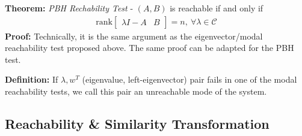 \documentclass[twoside]{article}
\begin{document}
\textbf{Theorem:} \textit{PBH Rechability Test} - $(A,B)$ is reachable if and only if 
%
\begin{align*}
    \mathrm{rank} \left[ \begin{array}{c|c} \lambda I - A & B \end{array} \right] = n , \ \forall \lambda \in \mathcal{C}
\end{align*}
%
\textbf{Proof:} Technically, it is the same argument as the eigenvector/modal reachability test proposed above. The same proof can be adapted for
the PBH test.

\textbf{Definition:} If $\lambda, w^T$ (eigenvalue, left-eigenvector) pair fails in one of the modal reachability tests, we call this 
pair an unreachable mode of the system. 

\subsection{Reachability \& Similarity Transformation}
\end{document}
